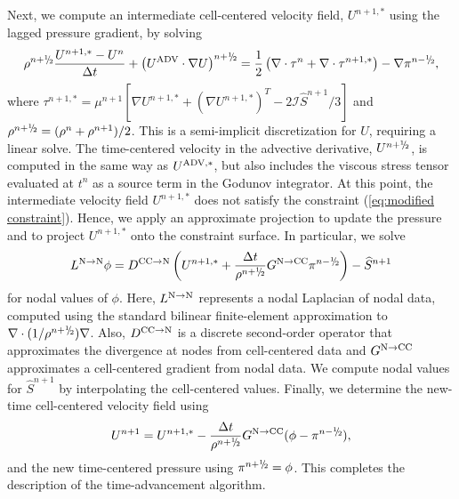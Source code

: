 Next, we compute an intermediate cell-centered velocity field, 
$U^{n+1,*}$ using the lagged pressure gradient, by solving
\begin{equation}
\rho^{n+\myhalf}\frac{U^{n+1,*}-U^n}{\Delta t} + \left(\uadv\cdot\nabla U\right)^{n+\myhalf} = \half\left(\nabla\cdot\tau^n + \nabla\cdot\tau^{n+1,*}\right) - \nabla\pi^{n-\myhalf},
\end{equation}
where $\tau^{n+1,*} = \mu^{n+1}[\nabla U^{n+1,*} +(\nabla U^{n+1,*})^T - 2\mathcal{I}\widehat S^{n+1}/3]$ and 
$\rho^{n+\myhalf} = (\rho^n + \rho^{n+1})/2$.  This is a semi-implicit discretization for $U$, requiring
a linear solve.  The time-centered velocity in the advective derivative,
$U^{n+\myhalf}$, is computed in the same way 
as $U^{{\rm ADV},*}$, but also includes the viscous stress tensor evaluated at $t^n$ as a source term
in the Godunov integrator.  At 
this point, the intermediate velocity field $U^{n+1,*}$ does not satisfy the constraint
(\ref{eq:modified constraint}).  Hence, we apply an 
approximate projection to update the pressure and to project $U^{n+1,*}$ onto the constraint surface.  
In particular, we solve
\begin{equation}
L^{{\rm N}\rightarrow{\rm N}}\phi = D^{{\rm CC}\rightarrow{\rm N}}\left(U^{n+1,*} + \frac{\Delta t}{\rho^{n+\myhalf}}G^{{\rm N}\rightarrow{\rm CC}}\pi^{n-\myhalf}\right) - \widehat S^{n+1}
\end{equation}
for nodal values of $\phi$.  Here, $L^{{\rm N}\rightarrow{\rm N}}$ represents a nodal Laplacian of nodal data, computed
using the standard bilinear finite-element approximation to $\nabla\cdot(1/\rho^{n+\myhalf})\nabla$.
Also, $D^{{\rm CC}\rightarrow{\rm N}}$ is a discrete
second-order operator that approximates the divergence at nodes from cell-centered data 
and $G^{{\rm N}\rightarrow{\rm CC}}$ approximates a cell-centered gradient from nodal data.  We compute nodal 
values for $\widehat S^{n+1}$ by interpolating the cell-centered values.  Finally, we 
determine the new-time cell-centered velocity field using
\begin{equation}
U^{n+1} = U^{n+1,*} - \frac{\Delta t}{\rho^{n+\myhalf}}G^{{\rm N}\rightarrow{\rm CC}}(\phi-\pi^{n-\myhalf}),
\end{equation}
and the new time-centered pressure using $\pi^{n+\myhalf} = \phi$.  This completes the 
description of the time-advancement algorithm.

